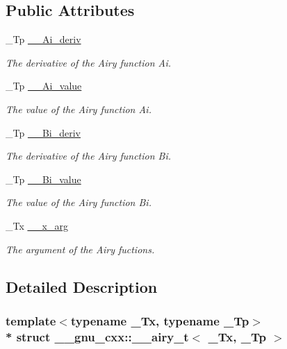 \subsection*{Public Attributes}
\begin{DoxyCompactItemize}
\item 
\+\_\+\+Tp \hyperlink{struct____gnu__cxx_1_1____airy__t_a253c354c2733e787d5e793d462d1a4d3}{\+\_\+\+\_\+\+Ai\+\_\+deriv}
\begin{DoxyCompactList}\small\item\em The derivative of the Airy function Ai. \end{DoxyCompactList}\item 
\+\_\+\+Tp \hyperlink{struct____gnu__cxx_1_1____airy__t_a2a22c1c3bab509b44e7093c3691d9b13}{\+\_\+\+\_\+\+Ai\+\_\+value}
\begin{DoxyCompactList}\small\item\em The value of the Airy function Ai. \end{DoxyCompactList}\item 
\+\_\+\+Tp \hyperlink{struct____gnu__cxx_1_1____airy__t_ad37670f1ff4859ff7bddf6875dbaee92}{\+\_\+\+\_\+\+Bi\+\_\+deriv}
\begin{DoxyCompactList}\small\item\em The derivative of the Airy function Bi. \end{DoxyCompactList}\item 
\+\_\+\+Tp \hyperlink{struct____gnu__cxx_1_1____airy__t_ab23888416f25e10da70692684cb586ec}{\+\_\+\+\_\+\+Bi\+\_\+value}
\begin{DoxyCompactList}\small\item\em The value of the Airy function Bi. \end{DoxyCompactList}\item 
\+\_\+\+Tx \hyperlink{struct____gnu__cxx_1_1____airy__t_ad9cdd72baf6f12cd65fcb099350a727f}{\+\_\+\+\_\+x\+\_\+arg}
\begin{DoxyCompactList}\small\item\em The argument of the Airy fuctions. \end{DoxyCompactList}\end{DoxyCompactItemize}


\subsection{Detailed Description}
\subsubsection*{template$<$typename \+\_\+\+Tx, typename \+\_\+\+Tp$>$\\*
struct \+\_\+\+\_\+gnu\+\_\+cxx\+::\+\_\+\+\_\+airy\+\_\+t$<$ \+\_\+\+Tx, \+\_\+\+Tp $>$}



